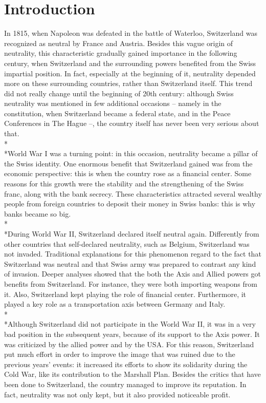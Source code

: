 \documentclass[a4paper]{article}
\begin{document}
\clearpage

\tableofcontents

\clearpage

\section{Introduction}
\label{sec:introduction}
In 1815, when Napoleon was defeated in the battle of Waterloo, Switzerland was recognized as neutral by France and Austria. Besides this vague origin of neutrality, this characteristic gradually gained importance in the following century, when Switzerland and the surrounding powers benefited from the Swiss impartial position. In fact, especially at the beginning of it, neutrality depended more on these surrounding countries, rather than Switzerland itself. This trend did not really change until the beginning of 20th century: although Swiss neutrality was mentioned in few additional occasions – namely in the constitution, when Switzerland became a federal state, and in the Peace Conferences in The Hague –, the country itself has never been very serious about that.
\\*\\*World War I was a turning point: in this occasion, neutrality became a pillar of the Swiss identity. One enormous benefit that Switzerland gained was from the economic perspective: this is when the country rose as a financial center. Some reasons for this growth were the stability and the strengthening of the Swiss franc, along with the bank secrecy. These characteristics attracted several wealthy people from foreign countries to deposit their money in Swiss banks: this is why banks became so big.
\\*\\*During World War II, Switzerland declared itself neutral again. Differently from other countries that self-declared neutrality, such as Belgium, Switzerland was not invaded. Traditional explanations for this phenomenon regard to the fact that Switzerland was neutral and that Swiss army was prepared to contrast any kind of invasion. Deeper analyses showed that the both the Axis and Allied powers got benefits from Switzerland. For instance, they were both importing weapons from it. Also, Switzerland kept playing the role of financial center. Furthermore, it played a key role as a transportation axis between Germany and Italy.
\\*\\*Although Switzerland did not participate in the World War II, it was in a very bad position in the subsequent years, because of its support to the Axis power. It was criticized by the allied power and by the USA. For this reason, Switzerland put much effort in order to improve the image that was ruined due to the previous years' events: it increased its efforts to show its solidarity during the Cold War, like its contribution to the Marshall Plan. Besides the critics that have been done to Switzerland, the country managed to improve its reputation. In fact, neutrality was not only kept, but it also provided noticeable profit. 
\end{document}
